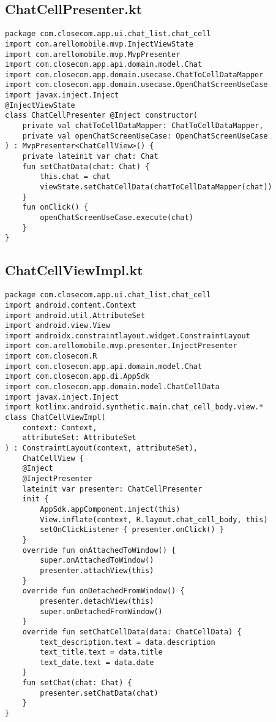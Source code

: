 \documentclass[listing]{espd}
\begin{document}
\subsection{ChatCellPresenter.kt}
\begin{verbatim}
package com.closecom.app.ui.chat_list.chat_cell
import com.arellomobile.mvp.InjectViewState
import com.arellomobile.mvp.MvpPresenter
import com.closecom.app.api.domain.model.Chat
import com.closecom.app.domain.usecase.ChatToCellDataMapper
import com.closecom.app.domain.usecase.OpenChatScreenUseCase
import javax.inject.Inject
@InjectViewState
class ChatCellPresenter @Inject constructor(
    private val chatToCellDataMapper: ChatToCellDataMapper,
    private val openChatScreenUseCase: OpenChatScreenUseCase
) : MvpPresenter<ChatCellView>() {
    private lateinit var chat: Chat
    fun setChatData(chat: Chat) {
        this.chat = chat
        viewState.setChatCellData(chatToCellDataMapper(chat))
    }
    fun onClick() {
        openChatScreenUseCase.execute(chat)
    }
}
\end{verbatim}

\subsection{ChatCellViewImpl.kt}
\begin{verbatim}
package com.closecom.app.ui.chat_list.chat_cell
import android.content.Context
import android.util.AttributeSet
import android.view.View
import androidx.constraintlayout.widget.ConstraintLayout
import com.arellomobile.mvp.presenter.InjectPresenter
import com.closecom.R
import com.closecom.app.api.domain.model.Chat
import com.closecom.app.di.AppSdk
import com.closecom.app.domain.model.ChatCellData
import javax.inject.Inject
import kotlinx.android.synthetic.main.chat_cell_body.view.*
class ChatCellViewImpl(
    context: Context,
    attributeSet: AttributeSet
) : ConstraintLayout(context, attributeSet),
    ChatCellView {
    @Inject
    @InjectPresenter
    lateinit var presenter: ChatCellPresenter
    init {
        AppSdk.appComponent.inject(this)
        View.inflate(context, R.layout.chat_cell_body, this)
        setOnClickListener { presenter.onClick() }
    }
    override fun onAttachedToWindow() {
        super.onAttachedToWindow()
        presenter.attachView(this)
    }
    override fun onDetachedFromWindow() {
        presenter.detachView(this)
        super.onDetachedFromWindow()
    }
    override fun setChatCellData(data: ChatCellData) {
        text_description.text = data.description
        text_title.text = data.title
        text_date.text = data.date
    }
    fun setChat(chat: Chat) {
        presenter.setChatData(chat)
    }
}
\end{verbatim}
\end{document}
